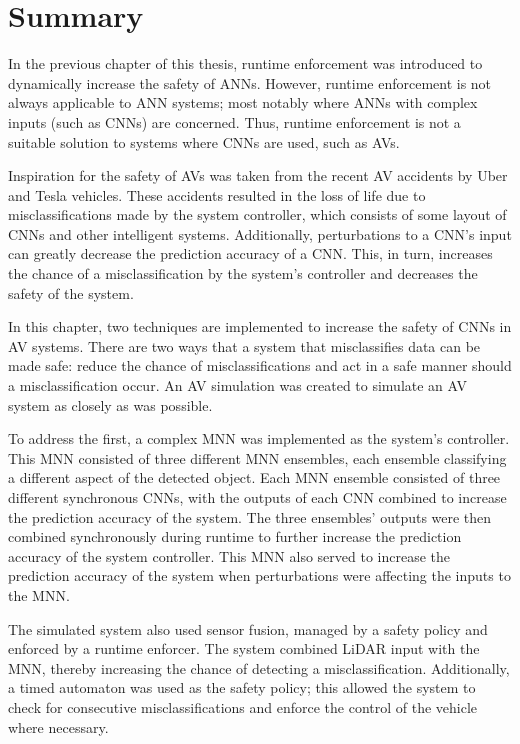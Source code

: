 \section{Summary}
In the previous chapter of this thesis, runtime enforcement was introduced to dynamically increase the safety of \acfp{ANN}.
However, runtime enforcement is not always applicable to \ac{ANN} systems; most notably where \acp{ANN} with complex inputs (such as \acfp{CNN}) are concerned.
Thus, runtime enforcement is not a suitable solution to systems where \acp{CNN} are used, such as \acfp{AV}.

Inspiration for the safety of \acp{AV} was taken from the recent \ac{AV} accidents by Uber and Tesla vehicles.
These accidents resulted in the loss of life due to misclassifications made by the system controller, which consists of some layout of \acp{CNN} and other intelligent systems.
Additionally, perturbations to a \ac{CNN}'s input can greatly decrease the prediction accuracy of a \ac{CNN}.
This, in turn, increases the chance of a misclassification by the system's controller and decreases the safety of the system.

In this chapter, two techniques are implemented to increase the safety of \acfp{CNN} in \acf{AV} systems.
There are two ways that a system that misclassifies data can be made safe: reduce the chance of misclassifications and act in a safe manner should a misclassification occur.
An \ac{AV} simulation was created to simulate an \ac{AV} system as closely as was possible.

To address the first, a complex \acf{MNN} was implemented as the system's controller.
This \ac{MNN} consisted of three different \ac{MNN} ensembles, each ensemble classifying a different aspect of the detected object.
Each \ac{MNN} ensemble consisted of three different synchronous \acp{CNN}, with the outputs of each \ac{CNN} combined to increase the prediction accuracy of the system.
The three ensembles' outputs were then combined synchronously during runtime to further increase the prediction accuracy of the system controller.
This \ac{MNN} also served to increase the prediction accuracy of the system when perturbations were affecting the inputs to the \ac{MNN}.

The simulated system also used sensor fusion, managed by a safety policy and enforced by a runtime enforcer.
The system combined \acf{LiDAR} input with the \ac{MNN}, thereby increasing the chance of detecting a misclassification.
Additionally, a timed automaton was used as the safety policy; this allowed the system to check for consecutive misclassifications and enforce the control of the vehicle where necessary.

